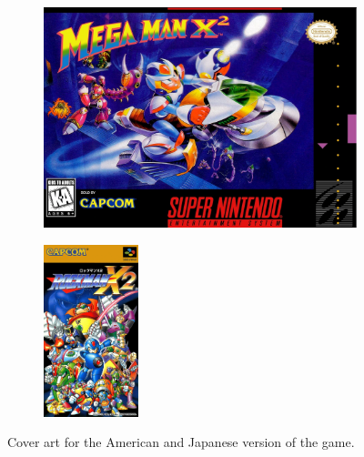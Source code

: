 \begin{figure}[htp]
	\centering
	\begin{subfigure}[c]{0.4\linewidth}
		\centering
		\includegraphics[width=\linewidth]{figures/X2/Mega_Man_X2_Box_Art.png}
	\end{subfigure}
	\begin{subfigure}[c]{0.4\linewidth}
		\centering
		\includegraphics[height=5cm]{figures/X2/Rockman_X2_Box_Art.png}
	\end{subfigure}
	\caption{Cover art for the American and Japanese version of the game.}
\end{figure}


